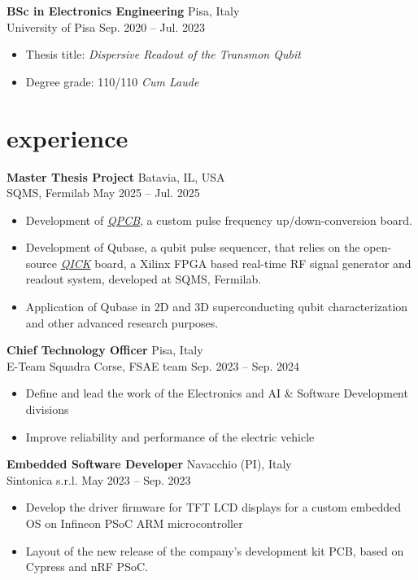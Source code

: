 \documentclass[10pt]{article}
\newcommand{\entry}[4]{{{\textbf{#1}}} \hfill #3 \\ #2 \hfill #4}
\begin{document}
\smallskip

\entry{BSc in Electronics Engineering}{University of Pisa}{Pisa, Italy}{Sep. 2020 -- Jul. 2023}
\begin{itemize}[noitemsep,leftmargin=3.5mm,rightmargin=0mm,topsep=6pt]
  \item Thesis title: \textit{Dispersive Readout of  the Transmon Qubit}
  \item Degree grade: 110/110 \textit{Cum Laude}

\end{itemize}

\section{experience}

\entry{Master Thesis Project}{SQMS, Fermilab}{Batavia, IL, USA}{May 2025 -- Jul. 2025}
\begin{itemize}[noitemsep,leftmargin=3.5mm,rightmargin=0mm,topsep=6pt]
	\item Development of \textit{\href{https://github.com/leonardobove/qpcb}{QPCB}}, a custom pulse frequency up/down-conversion board.
	\item Development of Qubase, a qubit pulse sequencer, that relies on the open-source \textit{\href{https://github.com/openquantumhardware/qick}{QICK}} board, a Xilinx FPGA based real-time RF signal generator and readout system, developed at SQMS, Fermilab.
	\item Application of Qubase in 2D and 3D superconducting qubit characterization and other advanced research purposes.  
\end{itemize}

\smallskip

\entry{Chief Technology Officer}{E-Team Squadra Corse, FSAE team}{Pisa, Italy}{Sep. 2023 -- Sep. 2024}
\begin{itemize}[noitemsep,leftmargin=3.5mm,rightmargin=0mm,topsep=6pt]
    \item Define and lead the work of the Electronics and AI \& Software Development divisions
    \item Improve reliability and performance of the electric vehicle 
\end{itemize}

\smallskip

\entry{Embedded Software Developer}{Sintonica s.r.l.}{Navacchio (PI), Italy}{May 2023 -- Sep. 2023}
\begin{itemize}[noitemsep,leftmargin=3.5mm,rightmargin=0mm,topsep=6pt]
    \item Develop the driver firmware for TFT LCD displays for a custom embedded OS on Infineon PSoC ARM microcontroller
    \item Layout of the new release of the company's development kit PCB, based on Cypress and nRF PSoC.
\end{itemize}
\end{document}
